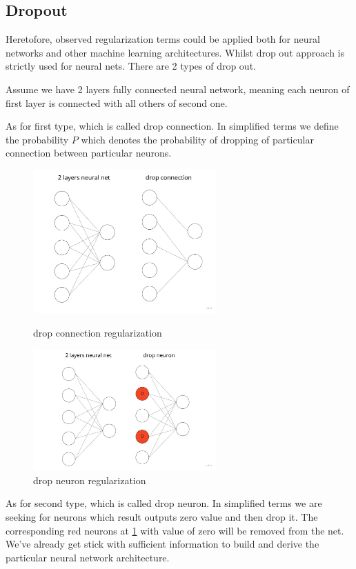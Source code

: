 \subsection{Dropout}
Heretofore, observed regularization terms could be applied both for neural networks and other machine learning architectures. Whilst drop out approach is strictly used for neural nets. There are 2 types of drop out. 

Assume we have 2 layers fully connected neural network, meaning each neuron of first layer is connected with all others of second one. 

As for first type, which is called drop connection. In simplified terms we define the probability $P$ which denotes the probability of dropping of particular connection between particular neurons.  

\begin{figure}[H]
\centering
\begin{minipage}{.48\linewidth}
    \includegraphics[width=7cm]{images/drop_connection.jpg}
    \caption {drop connection regularization}
    \label{fig:drop_connection}
\end{minipage}
\hfill
\begin{minipage}{.48\linewidth}
    \includegraphics[width=7cm]{images/drop_neuron.jpg}
    \caption {drop neuron regularization}
    \label{fig:drop_neuron}
\end{minipage}
\end{figure}

As for second type, which is called drop neuron. In simplified terms we are seeking for neurons which result outputs zero value and then drop it. The corresponding red neurons at \ref{fig:drop_neuron} with value of zero will be removed from the net. We've already get stick with sufficient information to build and derive the particular neural network architecture. 

